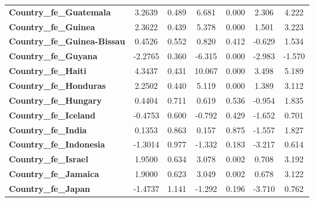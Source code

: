 \begin{center}
\begin{tabular}{lcccccc}
\textbf{Country\_fe\_Guatemala}                      &       3.2639  &        0.489     &     6.681  &         0.000        &        2.306    &        4.222     \\
\textbf{Country\_fe\_Guinea}                         &       2.3622  &        0.439     &     5.378  &         0.000        &        1.501    &        3.223     \\
\textbf{Country\_fe\_Guinea-Bissau}                  &       0.4526  &        0.552     &     0.820  &         0.412        &       -0.629    &        1.534     \\
\textbf{Country\_fe\_Guyana}                         &      -2.2765  &        0.360     &    -6.315  &         0.000        &       -2.983    &       -1.570     \\
\textbf{Country\_fe\_Haiti}                          &       4.3437  &        0.431     &    10.067  &         0.000        &        3.498    &        5.189     \\
\textbf{Country\_fe\_Honduras}                       &       2.2502  &        0.440     &     5.119  &         0.000        &        1.389    &        3.112     \\
\textbf{Country\_fe\_Hungary}                        &       0.4404  &        0.711     &     0.619  &         0.536        &       -0.954    &        1.835     \\
\textbf{Country\_fe\_Iceland}                        &      -0.4753  &        0.600     &    -0.792  &         0.429        &       -1.652    &        0.701     \\
\textbf{Country\_fe\_India}                          &       0.1353  &        0.863     &     0.157  &         0.875        &       -1.557    &        1.827     \\
\textbf{Country\_fe\_Indonesia}                      &      -1.3014  &        0.977     &    -1.332  &         0.183        &       -3.217    &        0.614     \\
\textbf{Country\_fe\_Israel}                         &       1.9500  &        0.634     &     3.078  &         0.002        &        0.708    &        3.192     \\
\textbf{Country\_fe\_Jamaica}                        &       1.9000  &        0.623     &     3.049  &         0.002        &        0.678    &        3.122     \\
\textbf{Country\_fe\_Japan}                          &      -1.4737  &        1.141     &    -1.292  &         0.196        &       -3.710    &        0.762     \\

\end{tabular}
\end{center}
